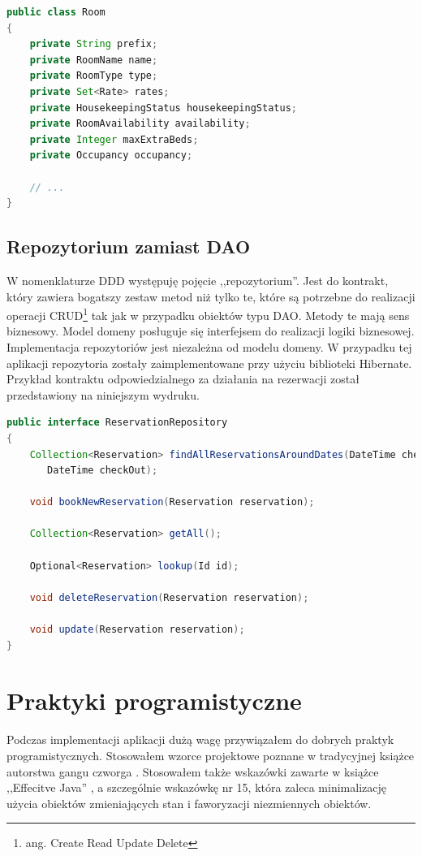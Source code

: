 \documentclass[a4paper,onecolumn,oneside,11pt,wide,floatssmall]{mwrep}
\theoremstyle{definition}
\theoremstyle{plain}%
\theoremstyle{remark}
\begin{document}
\begin{lstlisting}[language=Java,style=outcode,caption=Agregat]
public class Room
{
    private String prefix; 
    private RoomName name;
    private RoomType type;
    private Set<Rate> rates;
    private HousekeepingStatus housekeepingStatus;
    private RoomAvailability availability;
    private Integer maxExtraBeds;
    private Occupancy occupancy;

    // ...
}
\end{lstlisting}

\subsection{Repozytorium zamiast DAO}
W nomenklaturze DDD występuję pojęcie ,,repozytorium''. Jest do kontrakt, który zawiera bogatszy zestaw metod niż tylko te, które są potrzebne do realizacji operacji CRUD\footnote{ang. Create Read Update Delete} tak jak w przypadku obiektów typu DAO. Metody te mają sens biznesowy. Model domeny posługuje się interfejsem do realizacji logiki biznesowej. Implementacja repozytoriów jest niezależna od modelu domeny. W przypadku tej aplikacji repozytoria zostały zaimplementowane przy użyciu biblioteki Hibernate. Przykład kontraktu odpowiedzialnego za działania na rezerwacji został przedstawiony na niniejszym wydruku.

\begin{lstlisting}[language=Java,style=outcode,caption=Repozytorium rezerwacji]
public interface ReservationRepository
{
    Collection<Reservation> findAllReservationsAroundDates(DateTime checkIn,
       DateTime checkOut);

    void bookNewReservation(Reservation reservation);

    Collection<Reservation> getAll();

    Optional<Reservation> lookup(Id id);

    void deleteReservation(Reservation reservation);

    void update(Reservation reservation);
}
\end{lstlisting}

\section{Praktyki programistyczne}
Podczas implementacji aplikacji dużą wagę przywiązałem do dobrych praktyk programistycznych. Stosowałem wzorce projektowe poznane w tradycyjnej książce autorstwa gangu czworga \cite{gamma1994design}. Stosowałem także wskazówki zawarte w książce ,,Effecitve Java'' \cite{bloch2008effective}, a szczególnie wskazówkę nr 15, która zaleca minimalizację użycia obiektów zmieniających stan i faworyzacji niezmiennych obiektów.
\end{document}
